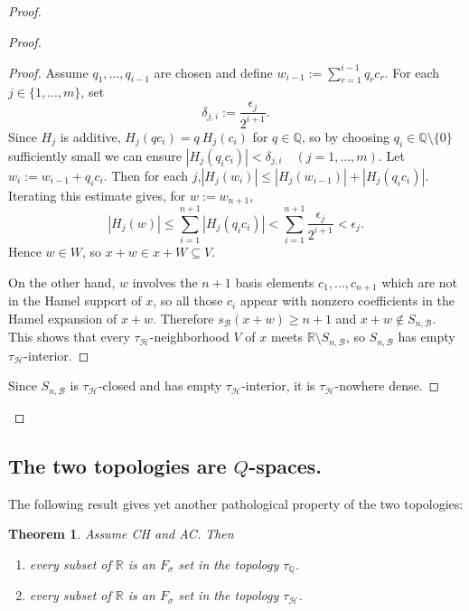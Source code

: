 \documentclass[11pt]{amsart} %
\newtheorem{theorem}{Theorem}[section]
\theoremstyle{definition}
\newcommand{\B}{\mathcal{B}}
\newcommand{\Q}{\mathbb{Q}}
\newcommand{\AD}{\mathcal{H}}
\begin{document}
\begin{proof}
\begin{proof}
\begin{proof}
Assume $q_{1},...,q_{i-1}$ are chosen and define $w_{i-1}:=\sum_{r=1}^{i-1}q_{r}c_{r}$. For each $j\in\{1,...,m\}$, set
\begin{equation} 
\delta_{j,i}:=\frac{\epsilon_{j}}{2^{i+1}}. 
\end{equation} 
Since $H_{j}$ is additive, $H_{j}(qc_{i})=q~H_{j}(c_{i})$ for $q\in\mathbb{Q}$, so by choosing $q_{i}\in\mathbb{Q}\setminus\{0\}$ sufficiently small we can ensure $|H_{j}(q_{i}c_{i})|<\delta_{j,i} \quad (j=1,...,m). $ 
Let $w_{i}:=w_{i-1}+q_{i}c_{i}$. Then for each $j$,$ |H_{j}(w_{i})|\le|H_{j}(w_{i-1})|+|H_{j}(q_{i}c_{i})|.$ 
Iterating this estimate gives, for $w:=w_{n+1}$,
\begin{equation} 
|H_{j}(w)|\le\sum_{i=1}^{n+1}|H_{j}(q_{i}c_{i})|<\sum_{i=1}^{n+1}\frac{\epsilon_{j}}{2^{i+1}}<\epsilon_{j}. \end{equation} 
Hence $w\in W$, so $x+w\in x+W\subseteq V$.

On the other hand, $w$ involves the $n+1$ basis elements $c_{1},...,c_{n+1}$ which are not in the Hamel support of $x$, so all those $c_{i}$ appear with nonzero coefficients in the Hamel expansion of $x+w$. Therefore $s_\B(x+w)\ge n+1$ and $x+w\notin S_{n,\B}$. This shows that every $\tau_{\AD}$-neighborhood $V$ of $x$ meets $\mathbb{R}\setminus S_{n,\B}$, so $S_{n,\B}$ has empty $\tau_{\AD}$-interior.
\end{proof} 
Since $S_{n,\B}$ is $\tau_{\AD}$-closed and has empty $\tau_{\AD}$-interior, it is $\tau_{\AD}$-nowhere dense. 
\end{proof}
\renewcommand{\qedsymbol}{}
\end{proof}

\subsection{The two topologies are $Q$-spaces.}
\label{sec:qspace} 
The following result gives yet another pathological property of the two topologies:

\begin{theorem}
\label{thm:7.5}
Assume CH and AC. Then
\begin{enumerate}
    \item[(a)] every subset of $\mathbb{R}$ is an $F_{\sigma}$ set in the topology $\tau_{\Q}$.
    \item[(b)] every subset of $\mathbb{R}$ is an $F_{\sigma}$ set in the topology $\tau_{\AD}$.
\end{enumerate}
\end{theorem}
\end{document}
